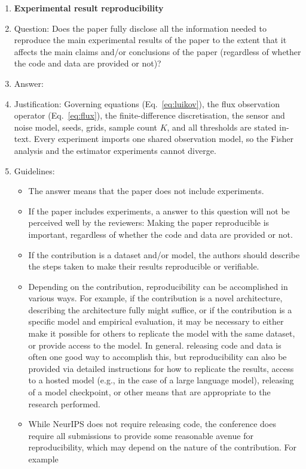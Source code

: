\begin{enumerate}
    \item {\bf Experimental result reproducibility}
    \item[] Question: Does the paper fully disclose all the information needed to reproduce the main experimental results of the paper to the extent that it affects the main claims and/or conclusions of the paper (regardless of whether the code and data are provided or not)?
    \item[] Answer: \answerYes{} %
    \item[] Justification: Governing equations (Eq.~\ref{eq:luikov}), the flux observation operator (Eq.~\ref{eq:flux}), the finite-difference discretisation, the sensor and noise model, seeds, grids, sample count $K$, and all thresholds are stated in-text. Every experiment imports one shared observation model, so the Fisher analysis and the estimator experiments cannot diverge.
    \item[] Guidelines:
    \begin{itemize}
        \item The answer \answerNA{} means that the paper does not include experiments.
        \item If the paper includes experiments, a \answerNo{} answer to this question will not be perceived well by the reviewers: Making the paper reproducible is important, regardless of whether the code and data are provided or not.
        \item If the contribution is a dataset and\slash or model, the authors should describe the steps taken to make their results reproducible or verifiable. 
        \item Depending on the contribution, reproducibility can be accomplished in various ways. For example, if the contribution is a novel architecture, describing the architecture fully might suffice, or if the contribution is a specific model and empirical evaluation, it may be necessary to either make it possible for others to replicate the model with the same dataset, or provide access to the model. In general. releasing code and data is often one good way to accomplish this, but reproducibility can also be provided via detailed instructions for how to replicate the results, access to a hosted model (e.g., in the case of a large language model), releasing of a model checkpoint, or other means that are appropriate to the research performed.
        \item While NeurIPS does not require releasing code, the conference does require all submissions to provide some reasonable avenue for reproducibility, which may depend on the nature of the contribution. For example

\end{itemize}
\end{enumerate}
